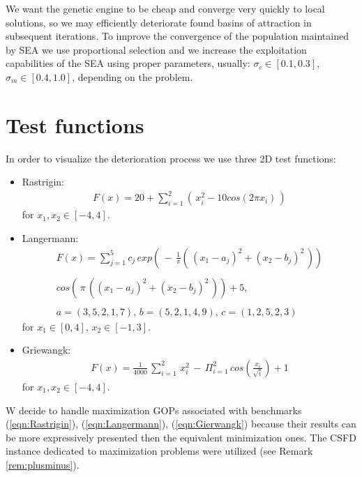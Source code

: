We want the genetic engine to be cheap and converge very quickly to local
solutions, so we may efficiently deteriorate found basins of attraction in 
subsequent iterations. To improve the convergence of the population maintained
by SEA we use proportional selection 
and we increase the
exploitation capabilities of the SEA using proper parameters, usually:
$\sigma_c \in [0.1, 0.3]$, $\sigma_m \in [0.4, 1.0]$, depending on the problem.


\section{Test functions}
\label{sec:testFun}
In order to visualize the deterioration process we use 
three 2D test functions:
\begin{itemize}
  \item Rastrigin: 
  \begin{equation}
  \label{eqn:Rastrigin}
  \begin{array}{c}
  F(x)= 20 + \sum_{i=1}^2 (\, x_i^2 - 10 cos(2 \pi x_i) \, )
  \end{array}
  \end{equation}
  for $x_1, x_2 \in [-4, 4]$.
  \item Langermann:
  \begin{equation}
  \label{eqn:Langermann}
  \begin{array}{c}
  F(x) = \sum_{j=1}^5 c_j \,
  exp(\, - \, \frac{1}{\pi}
  ( \, (x_1 - a_j)^2 + (x_2 - b_j)^2 \, ))\\ 
  \\
  cos(\, \pi \, ((x_1 - a_j)^2 + (x_2 - b_j)^2 \, )) + 5,\\ 
  \\ 
  a = (3,5,2,1,7), \, b = (5,2,1,4,9), \, c = (1,2,5,2,3)
  \end{array}
  \end{equation}
  for $x_1 \in [0, 4], \, x_2 \in [-1, 3]$.
  \item Griewangk:
  \begin{equation}
  \label{eqn:Gierwangk}
  \begin{array}{c}
  F(x)=\frac{1}{4000} \, \sum_{i=1}^2 \, x_i^2 \, - \, \Pi_{i=1}^2
  \, cos \left( \frac{x_i}{\sqrt{i}} \right) + 1
  \end{array}
  \end{equation}
  for $x_1, x_2 \in [-4, 4]$.
\end{itemize}

W decide to handle maximization GOPs associated with benchmarks
(\ref{eqn:Rastrigin}), (\ref{eqn:Langermann}), (\ref{eqn:Gierwangk}) 
because their results can be more
expressively presented then the equivalent minimization ones. 
The CSFD instance dedicated to maximization problems
were utilized (see Remark \ref{rem:plusminus}).


